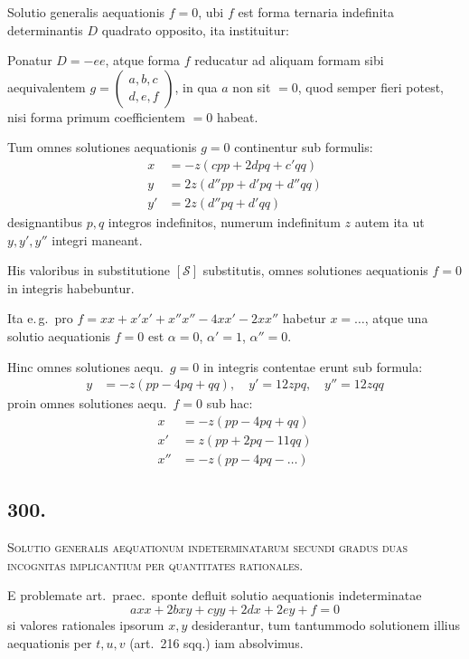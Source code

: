 \documentclass[12pt,a4paper]{article}
\theoremstyle{plain}
\theoremstyle{definition}
\theoremstyle{remark}
\begin{document}
Solutio generalis aequationis $f = 0$, ubi $f$ est forma ternaria indefinita
determinantis $D$ quadrato opposito, ita instituitur:

Ponatur $D = -ee$, atque forma $f$ reducatur ad aliquam formam sibi
aequivalentem $g = \begin{pmatrix} a, b, c \\ d, e, f \end{pmatrix}$, in qua $a$ non sit $= 0$, quod semper fieri
potest, nisi forma primum coefficientem $= 0$ habeat.

Tum omnes solutiones aequationis $g = 0$ continentur sub formulis:
\begin{align*}
x &= -z(cpp + 2dpq + c'qq) \\
y &= 2z(d''pp + d'pq + d''qq) \\
y' &= 2z(d''pq + d'qq)
\end{align*}
designantibus $p, q$ integros indefinitos, numerum indefinitum $z$ autem ita ut
$y, y', y''$ integri maneant.

His valoribus in substitutione $[\mathcal{S}]$ substitutis, omnes solutiones aequationis
$f = 0$ in integris habebuntur.

Ita e.\,g.\ pro $f = xx + x'x' + x''x'' - 4xx' - 2xx''$ habetur $x = \ldots$,
atque una solutio aequationis $f = 0$ est $\alpha = 0$, $\alpha' = 1$, $\alpha'' = 0$.

Hinc omnes solutiones aequ.\ $g = 0$ in integris contentae erunt sub formula:
\begin{align*}
y &= -z(pp - 4pq + qq), \quad y' = 12zpq, \quad y'' = 12zqq
\end{align*}
proin omnes solutiones aequ.\ $f = 0$ sub hac:
\begin{align*}
x &= -z(pp - 4pq + qq) \\
x' &= z(pp + 2pq - 11qq) \\
x'' &= -z(pp - 4pq - \ldots)
\end{align*}

\subsection*{300.}

\textsc{Solutio generalis aequationum indeterminatarum secundi gradus duas
incognitas implicantium per quantitates rationales.}

E problemate art.\@~praec.\ sponte defluit solutio aequationis indeterminatae
\[
axx + 2bxy + cyy + 2dx + 2ey + f = 0
\]
si valores rationales ipsorum $x, y$ desiderantur, tum tantummodo solutionem
illius aequationis per $t, u, v$ (art.\@~216 sqq.) iam absolvimus.
\end{document}
